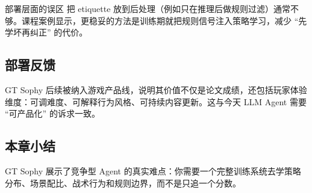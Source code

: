 \begin{warningbox}{部署层面的误区}
把 etiquette 放到后处理（例如只在推理后做规则过滤）通常不够。课程案例显示，更稳妥的方法是训练期就把规则信号注入策略学习，减少 ``先学坏再纠正'' 的代价。
\end{warningbox}

\subsection{部署反馈}
GT Sophy 后续被纳入游戏产品线，说明其价值不仅是论文成绩，还包括玩家体验维度：可调难度、可解释行为风格、可持续内容更新。这与今天 LLM Agent 需要 ``可产品化'' 的诉求一致。

\subsection{本章小结}
GT Sophy 展示了竞争型 Agent 的真实难点：你需要一个完整训练系统去学策略分布、场景配比、战术行为和规则边界，而不是只追一个分数。

